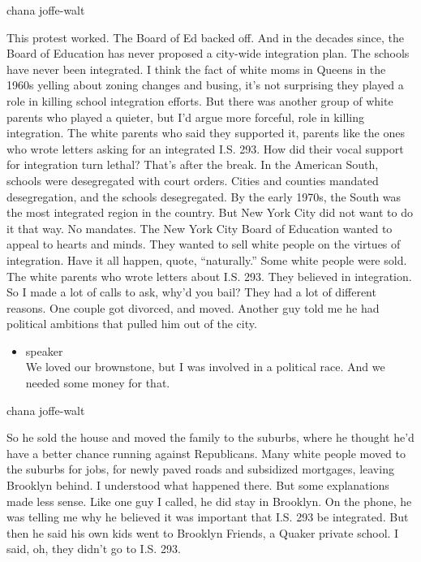 chana joffe-walt

This protest worked. The Board of Ed backed off. And in the decades
since, the Board of Education has never proposed a city-wide integration
plan. The schools have never been integrated. I think the fact of white
moms in Queens in the 1960s yelling about zoning changes and busing,
it's not surprising they played a role in killing school integration
efforts. But there was another group of white parents who played a
quieter, but I'd argue more forceful, role in killing integration. The
white parents who said they supported it, parents like the ones who
wrote letters asking for an integrated I.S. 293. How did their vocal
support for integration turn lethal? That's after the break. In the
American South, schools were desegregated with court orders. Cities and
counties mandated desegregation, and the schools desegregated. By the
early 1970s, the South was the most integrated region in the country.
But New York City did not want to do it that way. No mandates. The New
York City Board of Education wanted to appeal to hearts and minds. They
wanted to sell white people on the virtues of integration. Have it all
happen, quote, ``naturally.'' Some white people were sold. The white
parents who wrote letters about I.S. 293. They believed in integration.
So I made a lot of calls to ask, why'd you bail? They had a lot of
different reasons. One couple got divorced, and moved. Another guy told
me he had political ambitions that pulled him out of the city.

\begin{itemize}
\tightlist
\item
  speaker\\
  We loved our brownstone, but I was involved in a political race. And
  we needed some money for that.
\end{itemize}

chana joffe-walt

So he sold the house and moved the family to the suburbs, where he
thought he'd have a better chance running against Republicans. Many
white people moved to the suburbs for jobs, for newly paved roads and
subsidized mortgages, leaving Brooklyn behind. I understood what
happened there. But some explanations made less sense. Like one guy I
called, he did stay in Brooklyn. On the phone, he was telling me why he
believed it was important that I.S. 293 be integrated. But then he said
his own kids went to Brooklyn Friends, a Quaker private school. I said,
oh, they didn't go to I.S. 293.

